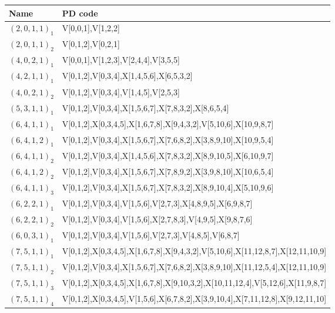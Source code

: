 \begin{table}[h]
\centering
\begin{tabular}{ll}
\hline
Name & PD code \\
\hline
$(2,0,1,1)_{1}$ & {\scriptsize\ttfamily V[0,0,1],V[1,2,2]} \\
$(2,0,1,1)_{2}$ & {\scriptsize\ttfamily V[0,1,2],V[0,2,1]} \\
$(4,0,2,1)_{1}$ & {\scriptsize\ttfamily V[0,0,1],V[1,2,3],V[2,4,4],V[3,5,5]} \\
$(4,2,1,1)_{1}$ & {\scriptsize\ttfamily V[0,1,2],V[0,3,4],X[1,4,5,6],X[6,5,3,2]} \\
$(4,0,2,1)_{2}$ & {\scriptsize\ttfamily V[0,1,2],V[0,3,4],V[1,4,5],V[2,5,3]} \\
$(5,3,1,1)_{1}$ & {\scriptsize\ttfamily V[0,1,2],V[0,3,4],X[1,5,6,7],X[7,8,3,2],X[8,6,5,4]} \\
$(6,4,1,1)_{1}$ & {\scriptsize\ttfamily V[0,1,2],X[0,3,4,5],X[1,6,7,8],X[9,4,3,2],V[5,10,6],X[10,9,8,7]} \\
$(6,4,1,2)_{1}$ & {\scriptsize\ttfamily V[0,1,2],V[0,3,4],X[1,5,6,7],X[7,6,8,2],X[3,8,9,10],X[10,9,5,4]} \\
$(6,4,1,1)_{2}$ & {\scriptsize\ttfamily V[0,1,2],V[0,3,4],X[1,4,5,6],X[7,8,3,2],X[8,9,10,5],X[6,10,9,7]} \\
$(6,4,1,2)_{2}$ & {\scriptsize\ttfamily V[0,1,2],V[0,3,4],X[1,5,6,7],X[7,8,9,2],X[3,9,8,10],X[10,6,5,4]} \\
$(6,4,1,1)_{3}$ & {\scriptsize\ttfamily V[0,1,2],V[0,3,4],X[1,5,6,7],X[7,8,3,2],X[8,9,10,4],X[5,10,9,6]} \\
$(6,2,2,1)_{1}$ & {\scriptsize\ttfamily V[0,1,2],V[0,3,4],V[1,5,6],V[2,7,3],X[4,8,9,5],X[6,9,8,7]} \\
$(6,2,2,1)_{2}$ & {\scriptsize\ttfamily V[0,1,2],V[0,3,4],V[1,5,6],X[2,7,8,3],V[4,9,5],X[9,8,7,6]} \\
$(6,0,3,1)_{1}$ & {\scriptsize\ttfamily V[0,1,2],V[0,3,4],V[1,5,6],V[2,7,3],V[4,8,5],V[6,8,7]} \\
$(7,5,1,1)_{1}$ & {\scriptsize\ttfamily V[0,1,2],X[0,3,4,5],X[1,6,7,8],X[9,4,3,2],V[5,10,6],X[11,12,8,7],X[12,11,10,9]} \\
$(7,5,1,1)_{2}$ & {\scriptsize\ttfamily V[0,1,2],V[0,3,4],X[1,5,6,7],X[7,6,8,2],X[3,8,9,10],X[11,12,5,4],X[12,11,10,9]} \\
$(7,5,1,1)_{3}$ & {\scriptsize\ttfamily V[0,1,2],X[0,3,4,5],X[1,6,7,8],X[9,10,3,2],X[10,11,12,4],V[5,12,6],X[11,9,8,7]} \\
$(7,5,1,1)_{4}$ & {\scriptsize\ttfamily V[0,1,2],X[0,3,4,5],V[1,5,6],X[6,7,8,2],X[3,9,10,4],X[7,11,12,8],X[9,12,11,10]} \\

\end{tabular}
\end{table}
